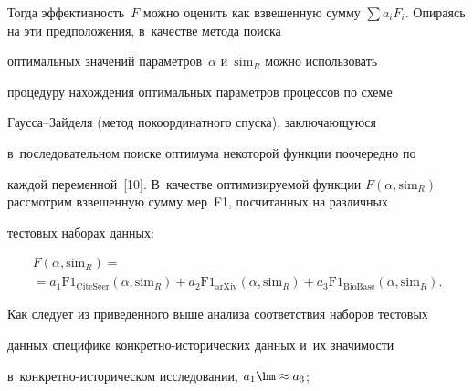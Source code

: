 Тогда эф\-фек\-тив\-ность~$F$ можно оценить как взвешенную сумму $\sum a_i 


F_i$. Опираясь на эти предположения, в~качестве метода поиска 


оптимальных значений па\-ра\-мет\-ров~$\alpha$ и~$\mathrm{sim}_R$ мож\-но использовать 


процедуру на\-хож\-де\-ния оптимальных па\-ра\-мет\-ров процессов по схеме  


Гаус\-са--Зай\-де\-ля (метод покоординатного спуска), за\-клю\-ча\-ющу\-юся 


в~последовательном поиске оптимума некоторой функции поочередно по 


каж\-дой переменной~[10]. В~качестве оптимизируемой функции $F(\alpha, 


\mathrm{sim}_R)$ рас\-смот\-рим взвешенную сумму мер~F1, по\-счи\-тан\-ных на различных 


тестовых наборах данных:





\vspace*{-6pt}





\noindent


  \begin{multline}


  F(\alpha, \mathrm{sim}_R) ={}\\


  {}=a_1 \mathrm{F1}_{\mathrm{CiteSeer}}\left(\alpha, \mathrm{sim}_R\right) +a_2 


\mathrm{F}1_{\mathrm{arXiv}} \left(\alpha, \mathrm{sim}_R\right) +a_3 \mathrm{F}1_{\mathrm{BioBase}} \left( \alpha, 


\mathrm{sim}_R\right).


  \label{e2-ad}


  \end{multline}


  


  \vspace*{-4pt}


  


  Как следует из приведенного выше анализа соответствия наборов тестовых 


данных специфике кон\-крет\-но-ис\-то\-ри\-че\-ских данных и~их зна\-чи\-мости 


в~кон\-крет\-но-ис\-то\-ри\-че\-ском исследовании, $a_1\hm\approx a_3$; 


